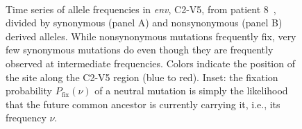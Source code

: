 \documentclass[rmp, twocolumn]{revtex4}
\newcommand{\env}{\textit{env}}
\begin{document}
\begin{figure}
\begin{center}
\\
\caption{Time series of allele frequencies in \env, C2-V5, from
patient 8~\cite{shankarappa_consistent_1999},
divided by synonymous (panel A) and nonsynonymous (panel B) derived alleles.
While nonsynonymous mutations frequently fix, very few synonymous
mutations do even though they are frequently observed at intermediate
frequencies. Colors indicate the position of the site along the C2-V5 region
(blue to red). Inset: the fixation probability $P_\text{fix}(\nu)$ of a neutral mutation
is simply the likelihood that the future common ancestor is currently carrying
it, i.e., its frequency $\nu$.}
\label{fig:aft}
\end{center}
\end{figure}
\end{document}
